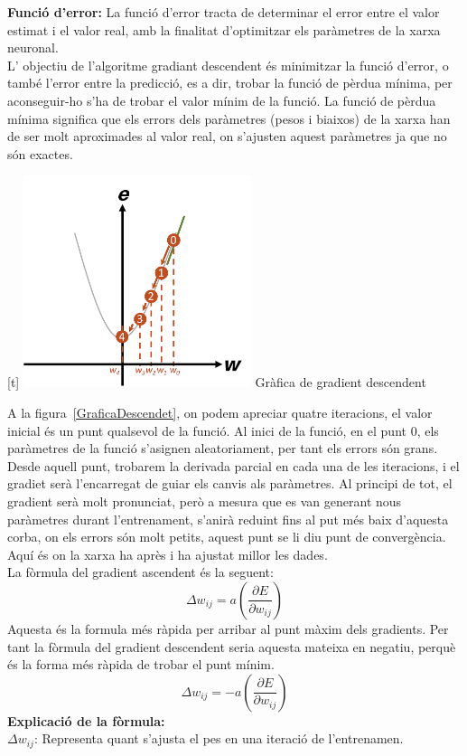         \textbf{Funció d'error: } La funció d'error tracta de determinar el error entre el valor estimat i el valor real, amb la finalitat d'optimitzar els paràmetres de la xarxa neuronal.\\

         L' objectiu de l'algoritme gradiant descendent és minimitzar la funció d'error, o també l'error entre la predicció, es a dir, trobar la funció de pèrdua mínima, per aconseguir-ho s'ha de trobar el valor mínim de la funció. La funció de pèrdua mínima significa que els errors dels paràmetres (pesos i biaixos) de la xarxa han de ser molt aproximades al valor real, on s'ajusten aquest paràmetres ja que no són exactes.\\


        \begin{center}[t]
         \centering
         \includegraphics[width=0.5\textwidth]{./figures/gradient_descendent.png}
        \small{Gràfica de gradient descendent}
        \label{GraficaDescendet}
         \end{center}

          A la figura~\ref{GraficaDescendet}, on podem apreciar quatre iteracions, el valor inicial és un punt qualsevol de la funció. Al inici de la funció, en el punt 0, els paràmetres de la funció s'asignen aleatoriament, per tant els errors són grans. Desde aquell punt, trobarem la derivada parcial en cada una de les iteracions, i el gradiet serà l'encarregat de guiar els canvis als paràmetres.
          Al principi de tot, el gradient serà molt pronunciat, però a mesura que es van generant nous paràmetres durant l'entrenament, s'anirà reduint fins al put més baix d'aquesta corba, on els errors són molt petits, aquest punt se li diu punt de convergència. Aquí és on la xarxa ha après i ha ajustat millor les dades.\\

          La fòrmula del gradient ascendent és la seguent:
          $$\Delta w_{ij} = a \left( \frac{\partial E}{\partial w_{ij}} \right)$$
          Aquesta és la formula més ràpida per arribar al punt màxim dels gradients. Per tant la fòrmula del gradient descendent seria aquesta mateixa en negatiu, perquè és la forma més ràpida de trobar el punt mínim.
          $$\Delta w_{ij} = -a \left( \frac{\partial E}{\partial w_{ij}} \right)$$
          \textbf{Explicació de la fòrmula:}\\
           $\Delta w_{ij}$: Representa quant s'ajusta el pes en una iteració de l'entrenamen.

